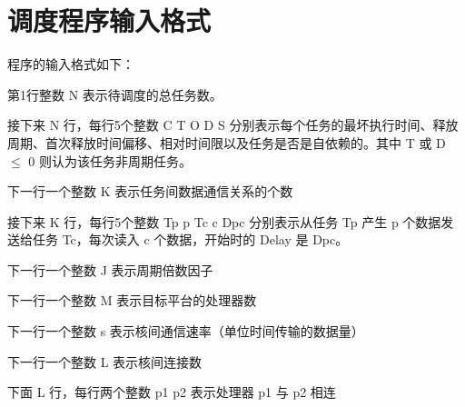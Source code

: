 ﻿%

\chapter{调度程序输入格式}

程序的输入格式如下：

第1行整数 N 表示待调度的总任务数。

接下来 N 行，每行5个整数 C T O D S 分别表示每个任务的最坏执行时间、释放周期、首次释放时间偏移、相对时间限以及任务是否是自依赖的。其中 T 或 D $\leqslant$ 0 则认为该任务非周期任务。

下一行一个整数 K 表示任务间数据通信关系的个数

接下来 K 行，每行5个整数 Tp p Tc c Dpc 分别表示从任务 Tp 产生 p 个数据发送给任务 Tc，每次读入 c 个数据，开始时的 Delay 是 Dpc。

下一行一个整数 J 表示周期倍数因子

下一行一个整数 M 表示目标平台的处理器数

下一行一个整数 s 表示核间通信速率（单位时间传输的数据量）

下一行一个整数 L 表示核间连接数

下面 L 行，每行两个整数 p1 p2 表示处理器 p1 与 p2 相连
